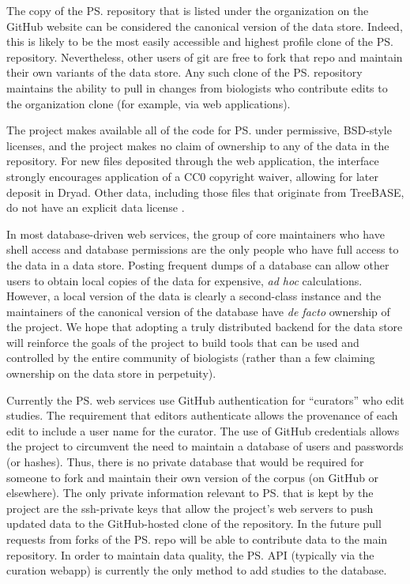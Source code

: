 The copy of the \ps repository that is listed under the \otol organization on
    the GitHub website %
    can be considered the canonical version of the data store.
Indeed, this is likely to be the most easily accessible and highest profile clone of the \ps repository.
Nevertheless, other users of git are free to fork that repo and maintain their own variants of the data store.
Any such clone of the \ps repository maintains the ability to pull in changes from biologists who contribute
    edits to the \otol organization clone (for example, via \otol web applications).

The \otol project makes available all of the code for \ps under permissive, BSD-style licenses, and the
    project makes no claim of ownership to any of the data in the repository. 
For new files deposited through the web application, the interface strongly encourages application of a CC0 copyright waiver, 
    allowing for later deposit in Dryad. Other data, including those files that originate from TreeBASE,
    do not have an explicit data license \citep[although we believe that copyright does not apply to any of the data; see][]{Patterson2014}.

In most database-driven web services, the group of core maintainers who have shell access and 
    database permissions are the only people who have full access to the data in a data store.
Posting frequent dumps of a database can allow other users to obtain local copies of the data 
    for expensive, {\em ad hoc} calculations.
However, a local version of the data is clearly a second-class instance and the maintainers of the 
    canonical version of the database have {\em de facto} ownership of the project.
We hope that adopting a truly distributed backend for the data store will reinforce the goals
    of the \otol project to build tools that can be used and controlled by the entire community of biologists 
    (rather than a few claiming ownership on the data store in perpetuity).

Currently the \ps web services use GitHub authentication for ``curators'' who edit studies.
The requirement that editors authenticate allows the provenance of each edit to include 
    a user name for the curator.
The use of GitHub credentials allows the \otol project
    to circumvent the need to maintain a database of users and passwords (or hashes).
Thus, there is no private database that would be required for someone to fork and maintain their
    own version of the corpus (on GitHub or elsewhere).
The only private information relevant to \ps that is kept by the \otol project are the ssh-private
    keys that allow the project's web servers to push updated data to the GitHub-hosted clone of the 
    repository.
In the future pull requests from forks of the \ps repo will be able to contribute data to the main repository.
In order to maintain data quality, the \ps API (typically via the curation webapp) is currently the only method to add studies to the database.



